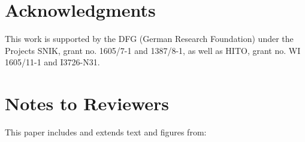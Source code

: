 \documentclass[sw]{iosart2x}
\renewcommand{\citet}{\cite}%
\begin{document}
\section{Acknowledgments}
This work is supported by the DFG (German Research Foundation) under the Projects SNIK, grant no. 1605/7-1 and 1387/8-1, as well as HITO, grant no. WI 1605/11-1 and I3726-N31.


\section{Notes to Reviewers}
This paper includes and extends text and figures from:
\citet{snikgraph}
\end{document}
